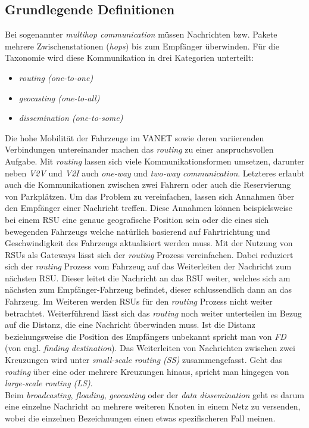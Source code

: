 \documentclass[english,runningheads,a4paper]{llncs}[2018/03/10]
\begin{document}
\subsection{Grundlegende Definitionen}
Bei sogenannter \textit{multihop communication} müssen Nachrichten bzw. Pakete mehrere Zwischenstationen (\textit{hops}) bis zum Empfänger überwinden.
Für die Taxonomie wird diese Kommunikation in drei Kategorien unterteilt:
\begin{itemize}
  \item \textit{routing (one-to-one)}
  \item \textit{geocasting (one-to-all)}
  \item \textit{dissemination (one-to-some)}
\end{itemize}
Die hohe Mobilität der Fahrzeuge im VANET sowie deren variierenden Verbindungen untereinander machen das \textit{routing} zu einer anspruchsvollen Aufgabe.
Mit \textit{routing} lassen sich viele Kommunikationsformen umsetzen, darunter neben \textit{V2V} und \textit{V2I} auch \textit{one-way} und \textit{two-way communication}.
Letzteres erlaubt auch die Kommunikationen zwischen zwei Fahrern oder auch die Reservierung von Parkplätzen.
Um das Problem zu vereinfachen, lassen sich Annahmen über den Empfänger einer Nachricht treffen.
Diese Annahmen können beispielsweise bei einem RSU eine genaue geografische Position sein oder die eines sich bewegenden Fahrzeugs welche natürlich basierend auf Fahrtrichtung und Geschwindigkeit des Fahrzeugs aktualisiert werden muss.
Mit der Nutzung von RSUs als Gateways lässt sich der \textit{routing} Prozess vereinfachen.
Dabei reduziert sich der \textit{routing} Prozess vom Fahrzeug auf das Weiterleiten der Nachricht zum nächsten RSU\@.
Dieser leitet die Nachricht an das RSU weiter, welches sich am nächsten zum Empfänger-Fahrzeug befindet, dieser schlussendlich dann an das Fahrzeug.
Im Weiteren werden RSUs für den \textit{routing} Prozess nicht weiter betrachtet.
Weiterführend lässt sich das \textit{routing} noch weiter unterteilen im Bezug auf die Distanz, die eine Nachricht überwinden muss.
Ist die Distanz beziehungsweise die Position des Empfängers unbekannt spricht man von \textit{FD} (von engl. \textit{finding destination}).
Das Weiterleiten von Nachrichten zwischen zwei Kreuzungen wird unter \textit{small-scale routing (SS)} zusammengefasst.
Geht das \textit{routing} über eine oder mehrere Kreuzungen hinaus, spricht man hingegen von \textit{large-scale routing (LS)}\cite{conti2013mobile}.\\
Beim \textit{broadcasting}, \textit{floading}, \textit{geocasting} oder der \textit{data dissemination} geht es darum eine einzelne Nachricht an mehrere weiteren Knoten in einem Netz zu versenden, wobei die einzelnen Bezeichnungen einen etwas spezifischeren Fall meinen.
\end{document}
